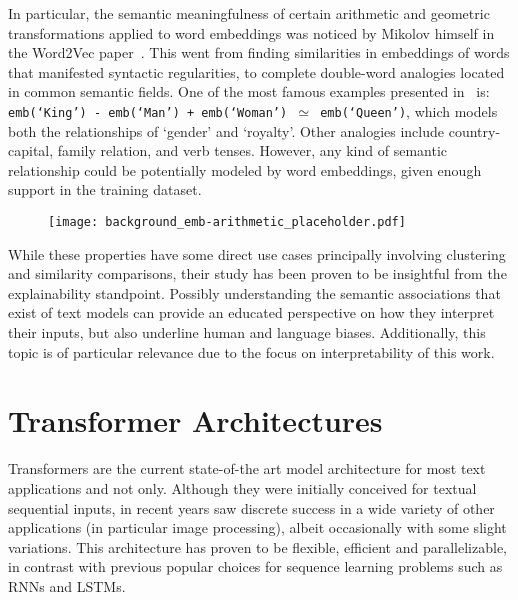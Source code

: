 In particular, the semantic meaningfulness of certain arithmetic and geometric transformations applied to word embeddings was noticed by Mikolov himself in the Word2Vec paper~\cite{mikolov2013}.
This went from finding similarities in embeddings of words that manifested syntactic regularities, to complete double-word analogies located in common semantic fields.
One of the most famous examples presented in~\cite{mikolov2013} is: \texttt{emb(`King') - emb(`Man') + emb(`Woman') $\simeq$ emb(`Queen')}, which models both the relationships of `gender' and `royalty'.
Other  analogies include country-capital, family relation, and verb tenses.
However, any kind of semantic relationship could be potentially modeled by word embeddings, given enough support in the training dataset.

\begin{figure}[H]
    \centering
    \texttt{[image: background\_emb-arithmetic\_placeholder.pdf]}
    \caption{}
    \label{fig:background_emb-arithmetic}
\end{figure}

While these properties have some direct use cases principally involving clustering and similarity comparisons, their study has been proven to be insightful from the explainability standpoint.
Possibly understanding the semantic associations that exist  of text models can provide an educated perspective on how they interpret their inputs, but also underline human and language biases.
Additionally, this topic is of particular relevance due to the focus on interpretability of this work.

\section{Transformer Architectures}

Transformers are the current state-of-the art model architecture for most text applications and not only.
Although they were initially conceived for textual sequential inputs, in recent years saw discrete success in a wide variety of other applications (in particular image processing), albeit occasionally with some slight variations.
This architecture has proven to be flexible, efficient and parallelizable, in contrast with previous popular choices for sequence learning problems such as RNNs and LSTMs.

